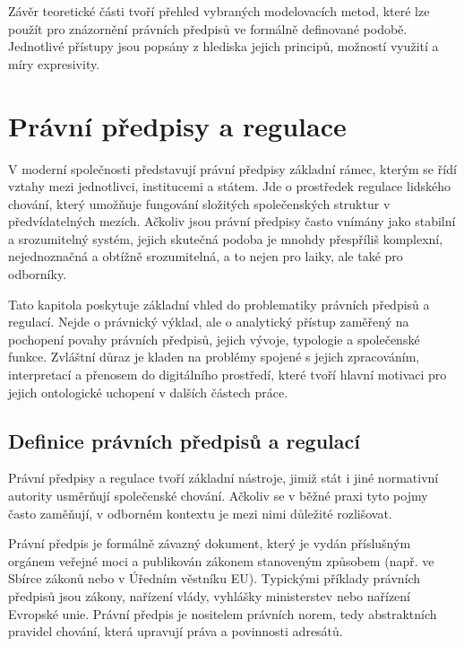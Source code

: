 Závěr teoretické části tvoří přehled vybraných modelovacích metod, které lze použít pro znázornění právních předpisů ve formálně definované podobě. Jednotlivé přístupy jsou popsány z hlediska jejich principů, možností využití a míry expresivity.

\newpage


\section{Právní předpisy a regulace}
\label{sec:právní-předpisy-a-regulace}
V moderní společnosti představují právní předpisy základní rámec, kterým se řídí vztahy mezi jednotlivci, institucemi a státem. Jde o prostředek regulace lidského chování, který umožňuje fungování složitých společenských struktur v předvídatelných mezích. Ačkoliv jsou právní předpisy často vnímány jako stabilní a srozumitelný systém, jejich skutečná podoba je mnohdy přespříliš komplexní, nejednoznačná a obtížně srozumitelná, a to nejen pro laiky, ale také pro odborníky.

Tato kapitola poskytuje základní vhled do problematiky právních předpisů a regulací. Nejde o právnický výklad, ale o analytický přístup zaměřený na pochopení povahy právních předpisů, jejich vývoje, typologie a společenské funkce. Zvláštní důraz je kladen na problémy spojené s jejich zpracováním, interpretací a přenosem do digitálního prostředí, které tvoří hlavní motivaci pro jejich ontologické uchopení v dalších částech práce.


\subsection{Definice právních předpisů a regulací}
\label{sec:definice-právních-předpisů-a-regulací}
Právní předpisy a regulace tvoří základní nástroje, jimiž stát i jiné normativní autority usměrňují společenské chování. Ačkoliv se v běžné praxi tyto pojmy často zaměňují, v odborném kontextu je mezi nimi důležité rozlišovat.

Právní předpis je formálně závazný dokument, který je vydán příslušným orgánem veřejné moci a publikován zákonem stanoveným způsobem (např. ve Sbírce zákonů nebo v Úředním věstníku EU). Typickými příklady právních předpisů jsou zákony, nařízení vlády, vyhlášky ministerstev nebo nařízení Evropské unie. Právní předpis je nositelem právních norem, tedy abstraktních pravidel chování, která upravují práva a povinnosti adresátů. \cite{Weinberger2017}


